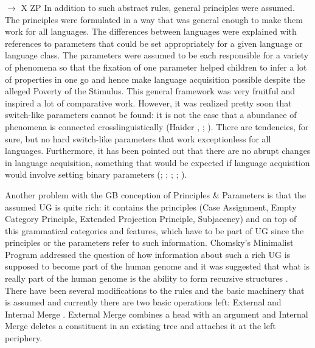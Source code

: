 \ex \xbar $\to$ X ZP
\zl
In addition to such abstract rules, general principles were assumed. The principles were formulated
in a way that was general enough to make them work for all languages. The differences between
languages were explained with references to parameters that could be set appropriately for a given
language or language class. The parameters were assumed to be each responsible for a variety of
phenomena so that the fixation of one parameter helped children to infer a lot of properties in one
go and hence make language acquisition possible despite the alleged Poverty of the Stimulus.
This general framework was very fruitful and inspired a lot of comparative work. However, it was
realized pretty soon that switch-like parameters cannot be found: it is not the case that a abundance of
phenomena is connected crosslinguistically (Haider \citeyear{Haider94c-u}, \citeyear[Section~2.2]{Haider2001a}; \citealp[Section~16.1]{MuellerGT-Eng1}). There are tendencies, for sure, but no hard switch-like
parameters that work exceptionless for all languages. Furthermore, it has been pointed out that there
are no abrupt changes in language acquisition, something that would be expected if language
acquisition would involve setting binary parameters (\citealp[]{Bloom93a}; \citealp[]{Haider93a}; \citealp[]{Abney96a}; \citealp[Section~9.1]{AW98a};
\citealp{Tomasello2000a,Tomasello2003a}). 

Another problem with the GB conception of Principles \& Parameters is that the assumed UG is quite
rich: it contains the principles (Case Assignment, Empty Category Principle, Extended Projection
Principle, Subjacency) and on top of this grammatical categories and features, which have to be part
of UG since the principles or the parameters refer to such information. Chomsky's Minimalist Program
addressed the question of how information about such a rich UG is supposed to become part of the
human genome and it was suggested that what is really part of the human genome is the ability to
form recursive structures \citep*{HCF2002a}. There have been several modifications to the rules and
the basic machinery that is assumed and currently there are two basic operations left: External and
Internal Merge \citep{Chomsky2001b-u}. External Merge combines a head with an argument and Internal Merge deletes a
constituent in an existing tree and attaches it at the left periphery.

